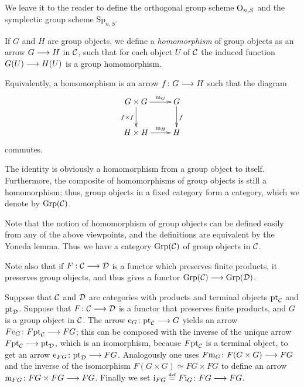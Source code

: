 \begin{2   CONTRAVARIANT FUNCTORS}
\begin{2.2 Group objects}
We leave it to the reader to define the orthogonal group scheme $\mathrm{O}_{n,S}$ and the symplectic group scheme $\mathrm{Sp}_{n,S}$.

\begin{definition}
If $G$ and $H$ are group objects, we define a \emph{homomorphism}%
%
 of group objects as an arrow $G \arr H$ in $\mathcal{C}$, such that for each object $U$ of $\mathcal{C}$ the induced function $G(U) \arr H(U)$ is a group homomorphism.

Equivalently, a homomorphism is an arrow $f \colon G \arr H$ such that the diagram
   \[
   \xymatrix{
   G \times G \ar[r]^-{\mul_G} \ar[d]_{f \times f} & G\ar[d]^f\\
   H \times H \ar[r]^-{\mul_H}                     & H
   }
   \]
commutes.
\end{definition}


The identity is obviously a homomorphism from a group object to itself. Furthermore, the composite of homomorphisms of group objects is still a homomorphism; thus, group objects in a fixed category form a category, which we denote by $\mathrm{Grp}(\mathcal{C})$.

\begin{shaded}
Note that the notion of homomorphism of group objects can be defined easily from any of the above viewpoints, and the definitions are equivalent by the Yoneda lemma. Thus we have a category $\mathrm{Grp}(\mathcal{C})$ of group objects in $\mathcal{C}$.

Note also that if $F:\mathcal{C}\longrightarrow\mathcal{D}$ is a functor which preserves finite products, it preserves group objects, and thus gives a functor $\mathrm{Grp}(\mathcal{C})\longrightarrow\mathrm{Grp}(\mathcal{D})$.
\end{shaded}
\begin{remark}\label{rmk:preserve-products->preserve-groups}
Suppose that $\mathcal{C}$ and $\mathcal{D}$ are categories with products and terminal objects $\mathrm{pt}_{\mathcal{C}}$ and $\mathrm{pt}_{\mathcal{D}}$. Suppose that $F \colon \cC \arr \cD$ is a functor that preserves finite products, and $G$ is a group object in $\mathcal{C}$. The arrow $\iden_G \colon \pt_{\cC} \arr G$ yields an arrow $F\iden_G \colon F\pt_{\cC} \arr FG$; this can be composed with the inverse of the unique arrow $F\pt_{\cC} \arr \pt_{\cD}$, which is an isomorphism, because $F\mathrm{pt}_{\mathcal{C}}$ is a terminal object, to get an arrow $\iden_{FG} \colon \pt_{\cD} \arr FG$. Analogously one uses $F\mul_{G} \colon F(G \times G) \arr FG$ and the inverse of the isomorphism $F(G \times G) \simeq FG \times FG$ to define an arrow $\mul_{FG} \colon FG \times FG \arr FG$. Finally we set $\inv_{FG} \eqdef F\inv_{G} \colon FG \arr FG$.


\end{remark}
\end{2.2 Group objects}
\end{2   CONTRAVARIANT FUNCTORS}
